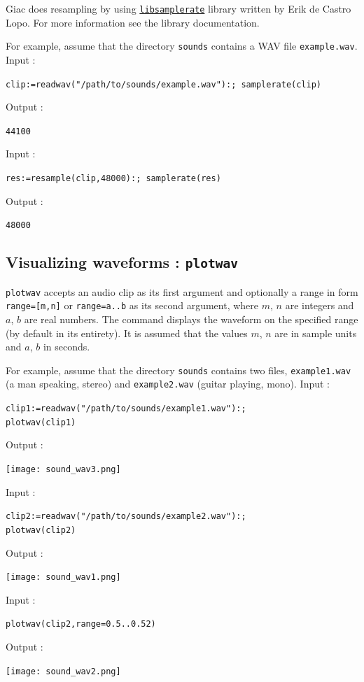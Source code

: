 \documentclass[a4paper,11pt]{book}
\begin{document}
Giac does resampling by using \href{http://www.mega-nerd.com/libsamplerate/}{\tt libsamplerate} library written by Erik de Castro Lopo. For more information see the library documentation.

For example, assume that the directory {\tt sounds} contains a WAV file {\tt example.wav}. Input :
\begin{center}
  \tt clip:=readwav("/path/to/sounds/example.wav"):; samplerate(clip)
\end{center}
Output :
\begin{center}
  \tt 44100
\end{center}
Input :
\begin{center}
  \tt res:=resample(clip,48000):; samplerate(res)
\end{center}
Output :
\begin{center}
  \tt 48000
\end{center}

\subsection{Visualizing waveforms : {\tt plotwav}}
{\tt plotwav} accepts an audio clip as its first argument and optionally a range in form {\tt range=[m,n]} or {\tt range=a..b} as its second argument, where $m$, $n$ are integers and $a$, $b$ are real numbers. The command displays the waveform on the specified range (by default in its entirety). It is assumed that the values $m$, $n$ are in sample units and $a$, $b$ in seconds.

For example, assume that the directory {\tt sounds} contains two files, {\tt example1.wav} (a man speaking, stereo) and {\tt example2.wav} (guitar playing, mono). Input :
\begin{center}
  \tt clip1:=readwav("/path/to/sounds/example1.wav"):;\\
  plotwav(clip1)
\end{center}
Output :
\begin{center}
  \texttt{[image: sound\_wav3.png]}
\end{center}
Input :
\begin{center}
  \tt clip2:=readwav("/path/to/sounds/example2.wav"):;\\
  plotwav(clip2)
\end{center}
Output :
\begin{center}
  \texttt{[image: sound\_wav1.png]}
\end{center}
Input :
\begin{center}
  \tt plotwav(clip2,range=0.5..0.52)
\end{center}
Output :
\begin{center}
  \texttt{[image: sound\_wav2.png]}
\end{center}
\end{document}
